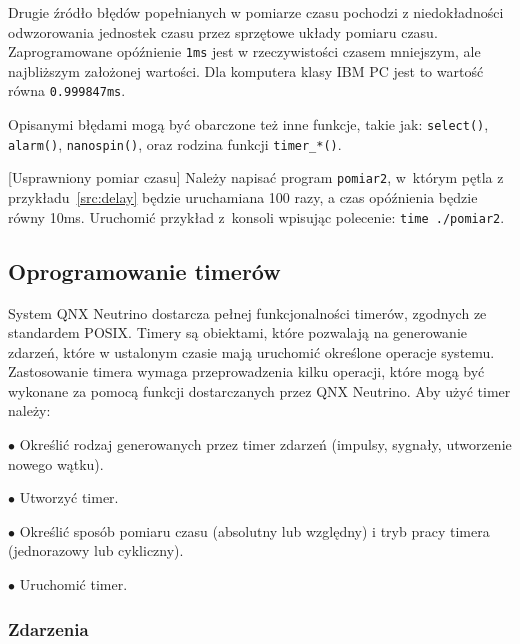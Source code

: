 Drugie źródło błędów popełnianych w pomiarze czasu pochodzi z niedokładności odwzorowania jednostek czasu przez sprzętowe układy pomiaru czasu. Zaprogramowane opóźnienie \lstinline[style=MyCStyle]{1ms} jest w rzeczywistości czasem mniejszym, ale najbliższym założonej wartości. Dla komputera klasy IBM PC jest to wartość równa \lstinline[style=MyCStyle]{0.999847ms}. 

Opisanymi błędami mogą być obarczone też inne funkcje, takie jak: \lstinline[style=MyCStyle]{select()}, \lstinline[style=MyCStyle]{alarm()}, \lstinline[style=MyCStyle]{nanospin()}, oraz rodzina funkcji \lstinline[style=MyCStyle]{timer_*()}.

\begin{example}{[Usprawniony pomiar czasu]} Należy napisać program \lstinline[style=MyCStyle]{pomiar2}, w~którym pętla z przykładu~\ref{src:delay} będzie uruchamiana 100 razy, a czas opóźnienia będzie równy 10ms. Uruchomić przykład z~konsoli wpisując polecenie: \lstinline[style=MyCStyle]{time ./pomiar2}. 
\end{example} 

\subsection{Oprogramowanie timerów}

System QNX Neutrino dostarcza pełnej funkcjonalności timerów, zgodnych ze standardem POSIX. Timery są obiektami, które pozwalają na generowanie zdarzeń, które w ustalonym czasie mają uruchomić określone operacje systemu. Zastosowanie timera wymaga przeprowadzenia kilku operacji, które mogą być wykonane za pomocą funkcji dostarczanych przez QNX Neutrino. Aby użyć timer należy: 

\begin{myitemize}
\item[$\bullet$] Określić rodzaj generowanych przez timer zdarzeń (impulsy, sygnały, utworzenie nowego wątku). 
\item[$\bullet$] Utworzyć timer. 
\item[$\bullet$] Określić sposób pomiaru czasu (absolutny lub względny) i tryb pracy timera (jednorazowy lub cykliczny). 
\item[$\bullet$] Uruchomić timer. 
\end{myitemize}

\subsubsection{Zdarzenia}


